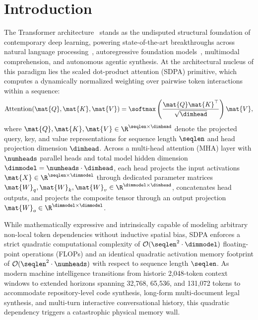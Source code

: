 
\section{Introduction}
\label{sec:introduction}

The Transformer architecture~\cite{vaswani2017attention} stands as the undisputed structural foundation of contemporary deep learning, powering state-of-the-art breakthroughs across natural language processing~\cite{devlin2019bert,liu2019roberta,radford2019language}, autoregressive foundation models~\cite{touvron2023llama,bai2023qwen}, multimodal comprehension, and autonomous agentic synthesis.
At the architectural nucleus of this paradigm lies the scaled dot-product attention (SDPA) primitive, which computes a dynamically normalized weighting over pairwise token interactions within a sequence:
\begin{equation}
\label{eq:sdpa_standard}
\operatorname{Attention}(\mat{Q}, \mat{K}, \mat{V}) = \softmax\left(\frac{\mat{Q}\mat{K}^\top}{\sqrt{\dimhead}}\right)\mat{V},
\end{equation}
where $\mat{Q}, \mat{K}, \mat{V} \in \R^{\seqlen \times \dimhead}$ denote the projected query, key, and value representations for sequence length $\seqlen$ and head projection dimension $\dimhead$.
Across a multi-head attention (MHA) layer with $\numheads$ parallel heads and total model hidden dimension $\dimmodel = \numheads \cdot \dimhead$, each head projects the input activations $\mat{X} \in \R^{\seqlen \times \dimmodel}$ through dedicated parameter matrices $\mat{W}_q, \mat{W}_k, \mat{W}_v \in \R^{\dimmodel \times \dimhead}$, concatenates head outputs, and projects the composite tensor through an output projection $\mat{W}_o \in \R^{\dimmodel \times \dimmodel}$.

While mathematically expressive and intrinsically capable of modeling arbitrary non-local token dependencies without inductive spatial bias, SDPA enforces a strict quadratic computational complexity of $\mathcal{O}(\seqlen^2 \cdot \dimmodel)$ floating-point operations (FLOPs) and an identical quadratic activation memory footprint of $\mathcal{O}(\seqlen^2 \cdot \numheads)$ with respect to sequence length $\seqlen$.
As modern machine intelligence transitions from historic 2,048-token context windows to extended horizons spanning 32,768, 65,536, and 131,072 tokens to accommodate repository-level code synthesis, long-form multi-document legal synthesis, and multi-turn interactive conversational history, this quadratic dependency triggers a catastrophic physical memory wall.

